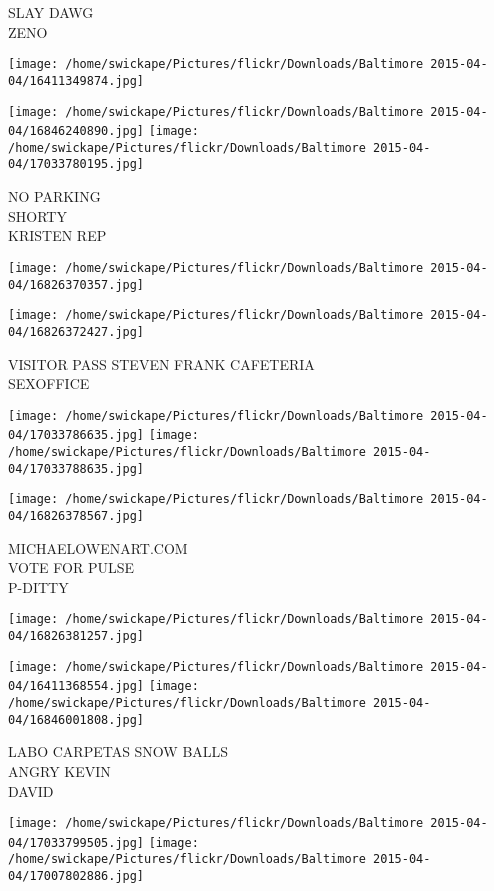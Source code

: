 \documentclass[10pt,letterpaper]{article}
\begin{document}
SLAY DAWG\\
ZENO
\pagebreak

\texttt{[image: /home/swickape/Pictures/flickr/Downloads/Baltimore 2015-04-04/16411349874.jpg]}

\vspace{0.25in}
\texttt{[image: /home/swickape/Pictures/flickr/Downloads/Baltimore 2015-04-04/16846240890.jpg]}
\texttt{[image: /home/swickape/Pictures/flickr/Downloads/Baltimore 2015-04-04/17033780195.jpg]}

NO PARKING\\
SHORTY\\
KRISTEN REP
\pagebreak

\texttt{[image: /home/swickape/Pictures/flickr/Downloads/Baltimore 2015-04-04/16826370357.jpg]}

\vspace{0.25in}
\texttt{[image: /home/swickape/Pictures/flickr/Downloads/Baltimore 2015-04-04/16826372427.jpg]}

VISITOR PASS STEVEN FRANK CAFETERIA\\
SEXOFFICE
\pagebreak

\texttt{[image: /home/swickape/Pictures/flickr/Downloads/Baltimore 2015-04-04/17033786635.jpg]}
\texttt{[image: /home/swickape/Pictures/flickr/Downloads/Baltimore 2015-04-04/17033788635.jpg]}

\vspace{0.25in}
\texttt{[image: /home/swickape/Pictures/flickr/Downloads/Baltimore 2015-04-04/16826378567.jpg]}

MICHAELOWENART.COM\\
VOTE FOR PULSE\\
P{-}DITTY
\pagebreak

\texttt{[image: /home/swickape/Pictures/flickr/Downloads/Baltimore 2015-04-04/16826381257.jpg]}

\vspace{0.25in}
\texttt{[image: /home/swickape/Pictures/flickr/Downloads/Baltimore 2015-04-04/16411368554.jpg]}
\texttt{[image: /home/swickape/Pictures/flickr/Downloads/Baltimore 2015-04-04/16846001808.jpg]}

LABO CARPETAS SNOW BALLS\\
ANGRY KEVIN\\
DAVID
\pagebreak

\texttt{[image: /home/swickape/Pictures/flickr/Downloads/Baltimore 2015-04-04/17033799505.jpg]}
\texttt{[image: /home/swickape/Pictures/flickr/Downloads/Baltimore 2015-04-04/17007802886.jpg]}
\end{document}
